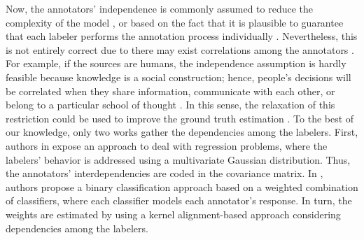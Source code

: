 \documentclass[journal]{IEEEtran}
\begin{document}
Now, the annotators' independence is commonly assumed to reduce the complexity of the model \cite{venanzi2014community}, or based on the fact that it is plausible to guarantee that each labeler performs the annotation process individually \cite{tang2019leveraging}. Nevertheless, this is not entirely correct due to there may exist correlations among the annotators \cite{zhang2011learning}. For example, if the sources are humans, the independence assumption is hardly feasible because knowledge is a social construction; hence, people's decisions will be correlated when they share information, communicate with each other, or belong to a particular school of thought \cite{surowiecki2005wisdom,hahn2018communication}. In this sense, the relaxation of this restriction could be used to improve the ground truth estimation \cite{g2019machine}. To the best of our knowledge, only two works gather the dependencies among the labelers. First, authors in \cite{zhu2019unsupervised} expose an approach to deal with regression problems, where the labelers' behavior is addressed using a multivariate Gaussian distribution. Thus, the annotators' interdependencies are coded in the covariance matrix.  In \cite{gil2018learning}, authors propose a binary classification approach based on a weighted combination of classifiers, where each classifier models each annotator's response. In turn, the weights are estimated by using a kernel alignment-based approach considering dependencies among the labelers. 
\end{document}
